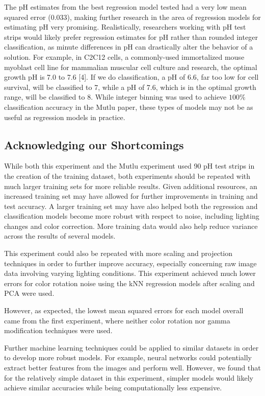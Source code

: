 \documentclass[journal]{IEEEtran}
\begin{document}
The pH estimates from the best regression model tested had a very low mean squared error ($0.033$), making further research in the area of regression models for estimating pH very promising. Realistically, researchers working with pH test strips would likely prefer regression estimates for pH rather than rounded integer classification, as minute differences in pH can drastically alter the behavior of a solution. For example, in C2C12 cells, a commonly-used immortalized mouse myoblast cell line for mammalian muscular cell culture and research, the optimal growth pH is 7.0 to 7.6 [4]. If we do classification, a pH of 6.6, far too low for cell survival, will be classified to 7, while a pH of 7.6, which is in the optimal growth range, will be classified to 8. While integer binning was used to achieve $100\%$ classification accuracy in the Mutlu paper, these types of models may not be as useful as regression models in practice. 

\subsection{Acknowledging our Shortcomings}
While both this experiment and the Mutlu experiment used 90 pH test strips in the creation of the training dataset, both experiments should be repeated with much larger training sets for more reliable results. Given additional resources, an increased training set may have allowed for further improvements in training and test accuracy. A larger training set may have also helped both the regression and classification models become more robust with respect to noise, including lighting changes and color correction. More training data would also help reduce variance across the results of several models. 

This experiment could also be repeated with more scaling and projection techniques in order to further improve accuracy, especially concerning raw image data involving varying lighting conditions. This experiment achieved much lower errors for color rotation noise using the kNN regression models after scaling and PCA were used. 

However, as expected, the lowest mean squared errors for each model overall came from the first experiment, where neither color rotation nor gamma modification techniques were used.

Further machine learning techniques could be applied to similar datasets in order to develop more robust models. For example, neural networks could potentially extract better features from the images and perform well. However, we found that for the relatively simple dataset in this experiment, simpler models would likely achieve similar accuracies while being computationally less expensive.
\end{document}
